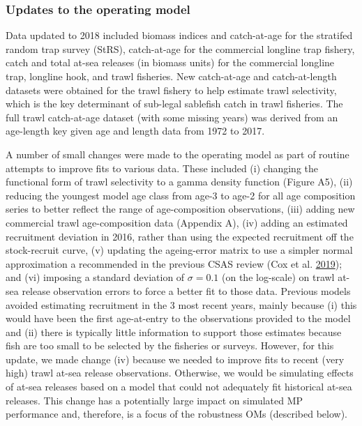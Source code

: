\documentclass[11pt]{book}
\begin{document}
\hypertarget{updates-to-the-operating-model}{%
\subsubsection{Updates to the operating model}\label{updates-to-the-operating-model}}

Data updated to 2018 included biomass indices and catch-at-age for the stratifed random trap survey (StRS), catch-at-age for the commercial longline trap fishery, catch and total at-sea releases (in biomass units) for the commercial longline trap, longline hook, and trawl fisheries. New catch-at-age and catch-at-length datasets were obtained for the trawl fishery to help estimate trawl selectivity, which is the key determinant of sub-legal sablefish catch in trawl fisheries. The full trawl catch-at-age dataset (with some missing years) was derived from an age-length key given age and length data from 1972 to 2017.

A number of small changes were made to the operating model as part of routine attempts to improve fits to various data. These included (i) changing the functional form of trawl selectivity to a gamma density function (Figure A5), (ii) reducing the youngest model age class from age-3 to age-2 for all age composition series to better reflect the range of age-composition observations, (iii) adding new commercial trawl age-composition data (Appendix A), (iv) adding an estimated recruitment deviation in 2016, rather than using the expected recruitment off the stock-recruit curve, (v) updating the ageing-error matrix to use a simpler normal approximation a recommended in the previous CSAS review (Cox et al. \protect\hyperlink{ref-cox2019evaluating}{2019}); and (vi) imposing a standard deviation of \(\sigma = 0.1\) (on the log-scale) on trawl at-sea release observation errors to force a better fit to those data. Previous models avoided estimating recruitment in the 3 most recent years, mainly because (i) this would have been the first age-at-entry to the observations provided to the model and (ii) there is typically little information to support those estimates because fish are too small to be selected by the fisheries or surveys. However, for this update, we made change (iv) because we needed to improve fits to recent (very high) trawl at-sea release observations. Otherwise, we would be simulating effects of at-sea releases based on a model that could not adequately fit historical at-sea releases. This change has a potentially large impact on simulated MP performance and, therefore, is a focus of the robustness OMs (described below).
\end{document}
